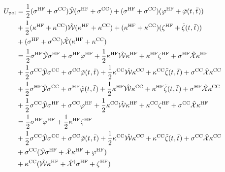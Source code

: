 \begin{equation}
  \begin{aligned}
  U_\mathrm{pol} &=
  \frac{1}{2}(\sigma^\mathrm{HF}+\sigma^\mathrm{CC})\PCM(\sigma^\mathrm{HF}+\sigma^\mathrm{CC})
+ (\sigma^\mathrm{HF}+\sigma^\mathrm{CC})(\esp^\mathrm{HF}+\tilde{\esp}(\tamp{},\tbar{})) \\
&+ \frac{1}{2}(\kappa^\mathrm{HF}+\kappa^\mathrm{CC})\MM(\kappa^\mathrm{HF}+\kappa^\mathrm{CC})
+ (\kappa^\mathrm{HF}+\kappa^\mathrm{CC})(\zeta^\mathrm{HF}+\tilde{\zeta}(\tamp{},\tbar{})) \\
&+ (\sigma^\mathrm{HF}+\sigma^\mathrm{CC})\bi{X}(\kappa^\mathrm{HF}+\kappa^\mathrm{CC}) \\
&=
    \frac{1}{2}\sigma^\mathrm{HF}\PCM\sigma^\mathrm{HF}
  + \sigma^\mathrm{HF}\esp^\mathrm{HF}
  + \frac{1}{2}\kappa^\mathrm{HF}\MM\kappa^\mathrm{HF}
  + \kappa^\mathrm{HF}\zeta^\mathrm{HF}
  + \sigma^\mathrm{HF}\bi{X}\kappa^\mathrm{HF} \\
&+  \frac{1}{2}\sigma^\mathrm{CC}\PCM\sigma^\mathrm{CC}
  + \sigma^\mathrm{CC}\tilde{\esp}(\tamp{},\tbar{})
  + \frac{1}{2}\kappa^\mathrm{CC}\MM\kappa^\mathrm{CC}
  + \kappa^\mathrm{CC}\tilde{\zeta}(\tamp{},\tbar{})
  + \sigma^\mathrm{CC}\bi{X}\kappa^\mathrm{CC} \\
&+  \frac{1}{2}\sigma^\mathrm{HF}\PCM\sigma^\mathrm{CC}
  + \sigma^\mathrm{HF}\tilde{\esp}(\tamp{},\tbar{})
  + \frac{1}{2}\kappa^\mathrm{HF}\MM\kappa^\mathrm{CC}
  + \kappa^\mathrm{HF}\tilde{\zeta}(\tamp{},\tbar{})
  + \sigma^\mathrm{HF}\bi{X}\kappa^\mathrm{CC} \\
&+  \frac{1}{2}\sigma^\mathrm{CC}\PCM\sigma^\mathrm{HF}
  + \sigma^\mathrm{CC}\esp^\mathrm{HF}
  + \frac{1}{2}\kappa^\mathrm{CC}\MM\kappa^\mathrm{HF}
  + \kappa^\mathrm{CC}\zeta^\mathrm{HF}
  + \sigma^\mathrm{CC}\bi{X}\kappa^\mathrm{HF} \\
&=
    \frac{1}{2}\sigma^\mathrm{HF}\esp^\mathrm{HF}
  + \frac{1}{2}\kappa^\mathrm{HF}\zeta^\mathrm{HF} \\
&+  \frac{1}{2}\sigma^\mathrm{CC}\PCM\sigma^\mathrm{CC}
  + \sigma^\mathrm{CC}\tilde{\esp}(\tamp{},\tbar{})
  + \frac{1}{2}\kappa^\mathrm{CC}\MM\kappa^\mathrm{CC}
  + \kappa^\mathrm{CC}\tilde{\zeta}(\tamp{},\tbar{})
  + \sigma^\mathrm{CC}\bi{X}\kappa^\mathrm{CC} \\
&+ \sigma^\mathrm{CC}(\bi{Y}\sigma^\mathrm{HF} + \bi{X}\kappa^\mathrm{HF} + \esp^\mathrm{HF}) \\
&+ \kappa^\mathrm{CC}(\bi{W}\kappa^\mathrm{HF} + \bi{X}^\dagger\sigma^\mathrm{HF} + \zeta^\mathrm{HF}) \\

\end{aligned}
\end{equation}
